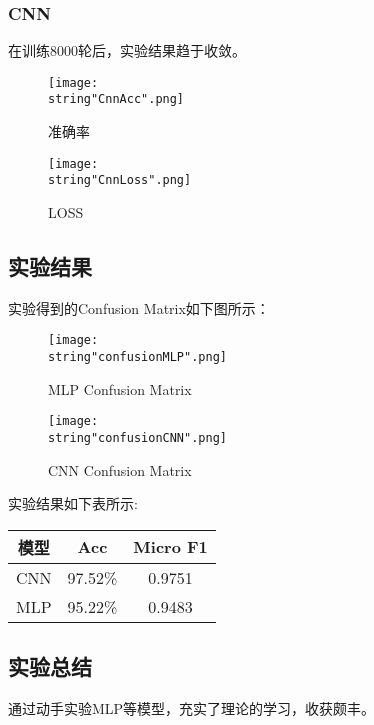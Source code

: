 \documentclass[UTF8]{ctexart}
\begin{document}
\subsubsection{CNN}

在训练8000轮后，实验结果趋于收敛。\par
\begin{figure}[H]
    \begin{center}
        \texttt{[image: \\string"CnnAcc".png]}
    \caption{准确率}
    \label{fig:3}
    \end{center}
    \end{figure}
\par

\begin{figure}[H]
    \begin{center}
        \texttt{[image: \\string"CnnLoss".png]}
    \caption{LOSS}
    \label{fig:4}
    \end{center}
    \end{figure}
\par






\subsection{实验结果}

实验得到的Confusion Matrix如下图所示：
\begin{figure}[H]
    \begin{center}
        \texttt{[image: \\string"confusionMLP".png]}
    \caption{MLP Confusion Matrix}
    \label{fig:5}
    \end{center}
    \end{figure}
\par
\begin{figure}[H]
    \begin{center}
        \texttt{[image: \\string"confusionCNN".png]}
    \caption{CNN Confusion Matrix}
    \label{fig:5}
    \end{center}
    \end{figure}
\par

实验结果如下表所示:

\begin{center}
    \begin{tabular}{||c c c||}
    \hline
    模型 & Acc & Micro F1\\ [0.5ex]
    \hline\hline\hline
    CNN & 97.52\% & 0.9751\\
    MLP & 95.22\% & 0.9483\\
    \hline
   \end{tabular}
   \end{center}


\subsection{实验总结}

通过动手实验MLP等模型，充实了理论的学习，收获颇丰。
\end{document}
